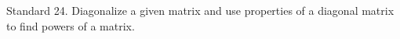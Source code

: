 Standard 24.	Diagonalize a given matrix and use properties of a diagonal matrix to find powers of a matrix.

\ifprintanswers
\else %
 \newpage
\fi

\begin{solution}
    
\end{solution}